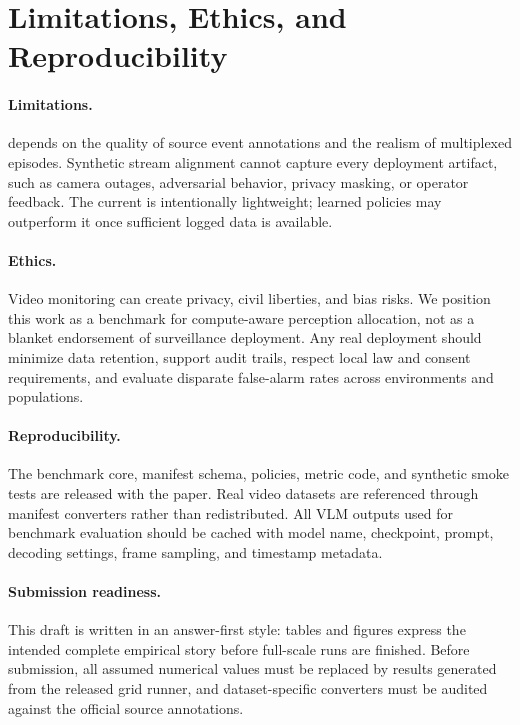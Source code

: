 \section{Limitations, Ethics, and Reproducibility}

\paragraph{Limitations.}
\benchmark{} depends on the quality of source event annotations and the realism of multiplexed episodes. Synthetic stream alignment cannot capture every deployment artifact, such as camera outages, adversarial behavior, privacy masking, or operator feedback. The current \method{} is intentionally lightweight; learned policies may outperform it once sufficient logged data is available.

\paragraph{Ethics.}
Video monitoring can create privacy, civil liberties, and bias risks. We position this work as a benchmark for compute-aware perception allocation, not as a blanket endorsement of surveillance deployment. Any real deployment should minimize data retention, support audit trails, respect local law and consent requirements, and evaluate disparate false-alarm rates across environments and populations.

\paragraph{Reproducibility.}
The benchmark core, manifest schema, policies, metric code, and synthetic smoke tests are released with the paper. Real video datasets are referenced through manifest converters rather than redistributed. All VLM outputs used for benchmark evaluation should be cached with model name, checkpoint, prompt, decoding settings, frame sampling, and timestamp metadata.

\paragraph{Submission readiness.}
This draft is written in an answer-first style: tables and figures express the intended complete empirical story before full-scale runs are finished. Before submission, all assumed numerical values must be replaced by results generated from the released grid runner, and dataset-specific converters must be audited against the official source annotations.
